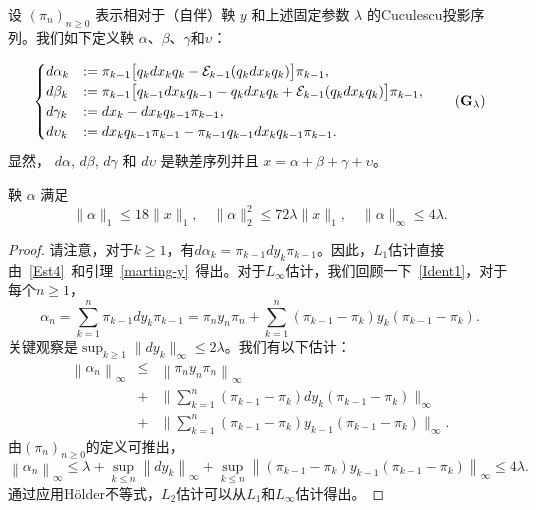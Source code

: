 设 $(\pi_n)_{n \ge 0}$ 表示相对于（自伴）鞅 $y$ 和上述固定参数 $\lambda$ 的Cuculescu投影序列。我们如下定义鞅 $\alpha$、$\beta$、$\gamma$和$\upsilon$：

\begin{equation*}\label{decomposition}
\begin{cases}
d\alpha_k &:= \pi_{k-1} \big[ q_k dx_k q_k - \E_{k-1} (q_k dx_k
q_k) \big] \pi_{k-1}, \\ d\beta_k &:= \pi_{k-1} \big[ q_{k-1}dx_k
q_{k-1}- q_k dx_k q_k + \E_{k-1} (q_k dx_k q_k) \big]\pi_{k-1}, \\
d\gamma_k &:=dx_k -  dx_k q_{k-1}\pi_{k-1},\\ d\upsilon_k &:=dx_k
q_{k-1}\pi_{k-1}-\pi_{k-1}q_{k-1}dx_k q_{k-1}\pi_{k-1}.
\end{cases} \tag{$\mathbf{G}_{\lambda}$}
\end{equation*}
显然， $d\alpha$, $d\beta$, $d\gamma$ 和 $d\upsilon$ 是鞅差序列并且 $x=\alpha +\beta +\gamma+\upsilon$。

\begin{lemma}\label{alpha-norm} 鞅 $\alpha$ 满足
$$\|\alpha\|_1 \leq 18 \|x\|_1, \quad \|\alpha\|_2^2 \leq 72
\lambda\|x\|_1, \quad \|\alpha\|_\infty \leq 4\lambda.$$
\end{lemma}
  
\begin{proof}
请注意，对于$k \geq 1$，有$d\alpha_k =
\pi_{k-1}dy_k\pi_{k-1}$。因此，$L_1$估计直接由~\eqref{Est4}~和引理~\ref{marting-y}~得出。对于$L_\infty$估计，我们回顾一下~\eqref{Ident1}，对于每个$n\geq 1$，
\[
\alpha_n= \sum_{k=1}^{n} \pi_{k-1} dy_k  \pi_{k-1} = \pi_n  y_n
\pi_n + \sum_{k=1}^{n} (\pi_{k-1}-\pi_{k}) y_k
(\pi_{k-1}-\pi_{k}).
  \]
关键观察是$\sup_{k\geq 1} \|dy_k\|_\infty \leq 2
\lambda$。我们有以下估计：
\begin{eqnarray*}
\left\|\alpha_n \right\|_\infty & \leq & \left\|\pi_n  y_n \pi_n
\right\|_\infty \\ & + & \Big\| \sum_{k=1}^{n} (\pi_{k-1}-\pi_{k})
dy_{k} (\pi_{k-1}-\pi_{k}) \Big\|_\infty
\\ & + & \Big\|\sum_{k=1}^{n}
(\pi_{k-1}-\pi_{k}) y_{k-1} (\pi_{k-1}-\pi_{k}) \Big\|_\infty.
\end{eqnarray*}
由$(\pi_n)_{n \ge 0}$的定义可推出，
$$\left\|\alpha_n \right\|_\infty \leq \lambda + \sup_{k \leq n}
\left\|dy_{k}\right\|_\infty + \sup_{k\leq n}
\left\|(\pi_{k-1}-\pi_{k}) y_{k-1}
(\pi_{k-1}-\pi_{k})\right\|_\infty \leq 4\lambda.$$ 通过应用H\"older不等式，$L_2$估计可以从$L_1$和$L_\infty$估计得出。
\end{proof}

